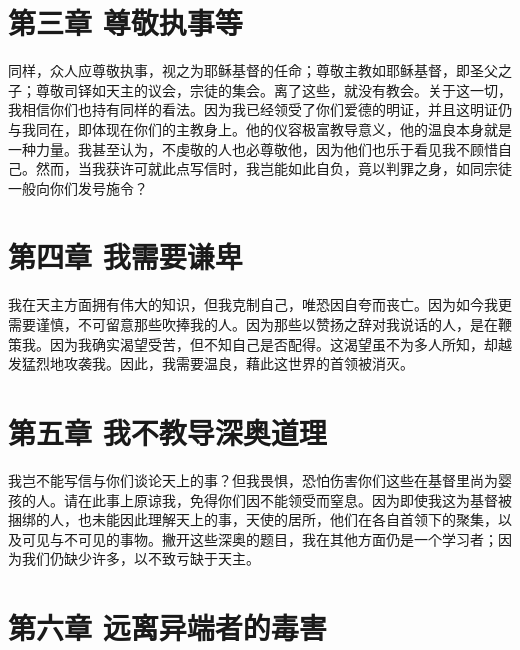 
\section{第三章 尊敬执事等}

同样，众人应尊敬执事，视之为耶稣基督的任命；尊敬主教如耶稣基督，即圣父之子；尊敬司铎如天主的议会，宗徒的集会。离了这些，就没有教会。关于这一切，我相信你们也持有同样的看法。因为我已经领受了你们爱德的明证，并且这明证仍与我同在，即体现在你们的主教身上。他的仪容极富教导意义，他的温良本身就是一种力量。我甚至认为，不虔敬的人也必尊敬他，因为他们也乐于看见我不顾惜自己。然而，当我获许可就此点写信时，我岂能如此自负，竟以判罪之身，如同宗徒一般向你们发号施令？\par


\section{第四章 我需要谦卑}

我在天主方面拥有伟大的知识，但我克制自己，唯恐因自夸而丧亡。因为如今我更需要谨慎，不可留意那些吹捧我的人。因为那些以赞扬之辞对我说话的人，是在鞭策我。因为我确实渴望受苦，但不知自己是否配得。这渴望虽不为多人所知，却越发猛烈地攻袭我。因此，我需要温良，藉此这世界的首领被消灭。\par


\section{第五章 我不教导深奥道理}

我岂不能写信与你们谈论天上的事？但我畏惧，恐怕伤害你们这些在基督里尚为婴孩的人。请在此事上原谅我，免得你们因不能领受而窒息。因为即使我这为基督被捆绑的人，也未能因此理解天上的事，天使的居所，他们在各自首领下的聚集，以及可见与不可见的事物。撇开这些深奥的题目，我在其他方面仍是一个学习者；因为我们仍缺少许多，以不致亏缺于天主。\par


\section{第六章 远离异端者的毒害}

